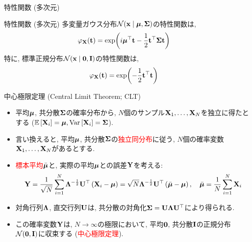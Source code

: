 \documentclass[dvipdfmx,notheorems,t]{beamer}
\begin{document}
\begin{frame}{特性関数 (多次元)}
\begin{block}{特性関数 (多次元)}
  多変量ガウス分布$\mathcal{N}(\vb{x} \mid \vb*{\mu}, \vb{\Sigma})$の特性関数は,
  \begin{align*}
    \varphi_{\vb{X}}(\vb{t}) &= \exp(
      i \vb*{\mu}^\top \vb{t} - \frac{1}{2} \vb{t}^\top \vb{\Sigma} \vb{t})
  \end{align*}
  特に, 標準正規分布$\mathcal{N}(\vb{x} \mid \vb{0}, \vb{I})$の特性関数は,
  \begin{align*}
    \varphi_{\vb{X}}(\vb{t}) &= \exp(-\frac{1}{2} \vb{t}^\top \vb{t})
  \end{align*}
\end{block}
\end{frame}

\begin{frame}{中心極限定理 (Central Limit Theorem; CLT)}
\begin{itemize}
  \item 平均$\vb*{\mu}$, 共分散$\vb{\Sigma}$の確率分布から, $N$個のサンプル$\vb{X}_1, \ldots, \vb{X}_N$を独立に得たとする
  ($\operatorname{\mathbb{E}} \left[ \vb{X}_i \right] = \vb*{\mu}, \operatorname{Var} \left[ \vb{X}_i \right] = \vb{\Sigma}$).
  \item 言い換えると, 平均$\vb*{\mu}$, 共分散$\vb{\Sigma}$の\textcolor{red}{独立同分布}に従う,
  $N$個の確率変数$\vb{X}_1, \ldots, \vb{X}_N$があるとする.
  \item \textcolor{red}{標本平均}$\bar{\vb*{\mu}}$と, 実際の平均$\vb*{\mu}$との誤差$\vb{Y}$を考える:
  {\small \begin{align*}
    \vb{Y} = \frac{1}{\sqrt{N}} \sum_{i = 1}^N \vb{\Lambda}^{-\frac{1}{2}} \vb{U}^\top \left( \vb{X}_i - \vb*{\mu} \right)
      = \sqrt{N} \vb{\Lambda}^{-\frac{1}{2}} \vb{U}^\top \left( \bar{\vb*{\mu}} - \vb*{\mu} \right), \quad
    \bar{\vb*{\mu}} = \frac{1}{N} \sum_{i = 1}^N \vb{X}_i
  \end{align*}}
  \item 対角行列$\vb{\Lambda}$, 直交行列$\vb{U}$は, 共分散の対角化$\vb{\Sigma} = \vb{U} \vb{\Lambda} \vb{U}^\top$により得られる.
  \item この確率変数$\vb{Y}$は, $N \to \infty$の極限において, 平均$\vb{0}$, 共分散$\vb{I}$の正規分布$\mathcal{N}(\vb{0}, \vb{I})$に収束する
  (\textcolor{red}{中心極限定理}).
\end{itemize}
\end{frame}
\end{document}
